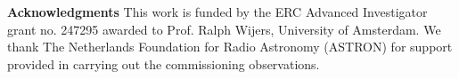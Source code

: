 \documentclass{ws-jai}
\begin{document}

\noindent  \textbf{Acknowledgments} This  work  is funded  by  the ERC  Advanced
Investigator  grant no.  247295 awarded  to Prof.   Ralph Wijers,  University of
Amsterdam.  We thank The Netherlands Foundation for Radio Astronomy (ASTRON) for
support provided in carrying out the commissioning observations.



\end{document}
